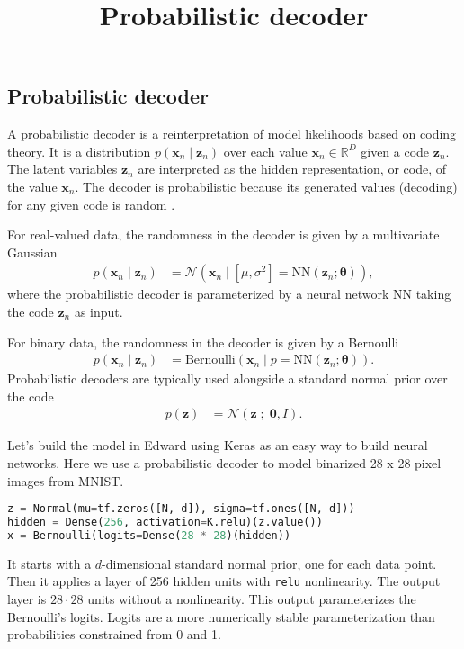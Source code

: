 \title{Probabilistic decoder}

\subsection{Probabilistic decoder}

A probabilistic decoder is a reinterpretation of model likelihoods
based on coding theory. It is a distribution $p(\mathbf{x}_n\mid \mathbf{z}_n)$  over each value
$\mathbf{x}_n\in\mathbb{R}^D$ given a code $\mathbf{z}_n$. The latent
variables $\mathbf{z}_n$ are interpreted as the hidden representation, or code, of the value
$\mathbf{x}_n$. The decoder is probabilistic because its generated
values (decoding) for any given code is random
\citep{dayan1995helmholtz}.

For real-valued data,
the randomness in the decoder is given by a multivariate Gaussian
\begin{align*}
  p(\mathbf{x}_n\mid\mathbf{z}_n)
  &=
  \mathcal{N}(\mathbf{x}_n\mid [\mu,\sigma^2]=\mathrm{NN}(\mathbf{z}_n; \mathbf{\theta})),
\end{align*}
where the probabilistic decoder is parameterized by a neural network
$\mathrm{NN}$ taking the code $\mathbf{z}_n$ as input.

For binary data,
the randomness in the decoder is given by a Bernoulli
\begin{align*}
  p(\mathbf{x}_n\mid\mathbf{z}_n)
  &=
  \text{Bernoulli}(\mathbf{x}_n\mid p=\mathrm{NN}(\mathbf{z}_n; \mathbf{\theta})).
\end{align*}
Probabilistic decoders are typically used alongside a standard normal
prior over the code
\begin{align*}
  p(\mathbf{z})
  &=
  \mathcal{N}(\mathbf{z} \;;\; \mathbf{0}, I).
\end{align*}

Let's build the model in Edward using
Keras as an easy way to build neural networks. Here we use a
probabilistic decoder to model binarized 28 x 28
pixel images from MNIST.
\begin{lstlisting}[language=Python]
z = Normal(mu=tf.zeros([N, d]), sigma=tf.ones([N, d]))
hidden = Dense(256, activation=K.relu)(z.value())
x = Bernoulli(logits=Dense(28 * 28)(hidden))
\end{lstlisting}
It starts with a $d$-dimensional standard normal prior, one for each
data point. Then it applies a layer of 256 hidden units with
\texttt{relu} nonlinearity. The output layer is $28\cdot 28$ units
without a nonlinearity. This output
parameterizes the Bernoulli's logits. Logits are a more numerically stable
parameterization than probabilities constrained
from 0 and 1.

